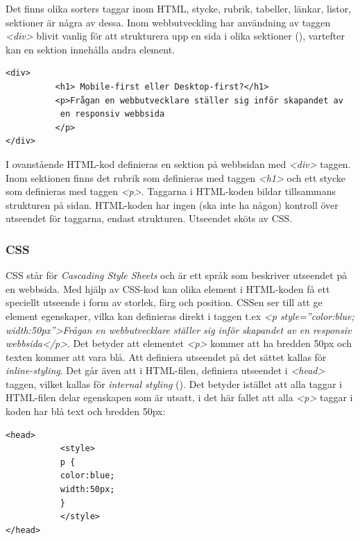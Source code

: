 \documentclass[11pt]{article}
\begin{document}
Det finns olika sorters taggar inom HTML, stycke, rubrik, tabeller, länkar, listor, sektioner är några av dessa. Inom webbutveckling har användning av taggen \textit{<div>} blivit vanlig för att strukturera upp en sida i olika sektioner (\cite{divtable}), vartefter kan en sektion innehålla andra element.

\vspace{0.3cm}
\begin{verbatim}
<div> 
          <h1> Mobile-first eller Desktop-first?</h1>
          <p>Frågan en webbutvecklare ställer sig inför skapandet av
           en responsiv webbsida
          </p>
</div>
\end{verbatim}
\vspace{0.3cm}

I ovanstående HTML-kod definieras en sektion på webbsidan med \textit{<div>} taggen. Inom sektionen finns det rubrik som definieras med taggen \textit{<h1>} och ett stycke som definieras med taggen \textit{<p>}. Taggarna i HTML-koden bildar tillsammans strukturen på sidan. HTML-koden har ingen (ska inte ha någon) kontroll över utseendet för taggarna, endast strukturen. Utseendet sköts av CSS.

\subsubsection{CSS}
CSS står för \textit{Cascading Style Sheets} och är ett språk som beskriver utseendet på en webbsida.
Med hjälp av CSS-kod kan olika element i HTML-koden få ett speciellt utseende i form av storlek, färg och position. CSSen ser till att ge element egenskaper, vilka kan definieras direkt i taggen t.ex \textit{<p style=”color:blue; width:50px”>Frågan en webbutvecklare ställer sig inför skapandet av en responsiv webbsida</p>}. Det betyder att elementet \textit{<p>} kommer att ha bredden 50px och texten kommer att vara blå. Att definiera utseendet på det sättet kallas för \textit{inline-styling}. Det går även att i HTML-filen, definiera utseendet i \textit{<head>} taggen, vilket kallas för \textit{internal styling} (\cite{css}). Det betyder istället att alla taggar i HTML-filen delar egenskapen som är utsatt, i det här fallet att alla \textit{<p>} taggar i koden har blå text och bredden 50px:

\vspace{0.3cm}
\begin{verbatim}
<head>
           <style>
           p {
           color:blue;
           width:50px;
           }
           </style>
</head>
\end{verbatim}
\vspace{0.3cm}
\end{document}
